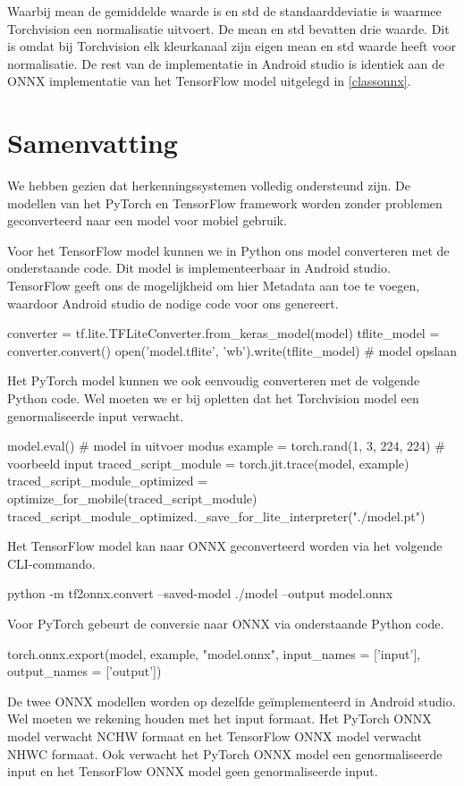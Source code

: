 Waarbij mean de gemiddelde waarde is en std de standaarddeviatie is waarmee Torchvision een normalisatie uitvoert.
De mean en std bevatten drie waarde.
Dit is omdat bij Torchvision elk kleurkanaal zijn eigen mean en std waarde heeft voor normalisatie.
De rest van de implementatie in Android studio is identiek aan de ONNX implementatie van het TensorFlow model uitgelegd in \ref{classonnx}. 

\section{Samenvatting}
We hebben gezien dat herkenningssystemen volledig ondersteund zijn.
De modellen van het PyTorch en TensorFlow framework worden zonder problemen geconverteerd naar een model voor mobiel gebruik.

Voor het TensorFlow model kunnen we in Python ons model converteren met de onderstaande code.
Dit model is implementeerbaar in Android studio.
TensorFlow geeft ons de mogelijkheid om hier Metadata aan toe te voegen, waardoor Android studio de nodige code voor ons genereert.

\begin{python}
    converter = tf.lite.TFLiteConverter.from_keras_model(model)
    tflite_model = converter.convert()
    open('model.tflite', 'wb').write(tflite_model) # model opslaan
\end{python}

Het PyTorch model kunnen we ook eenvoudig converteren met de volgende Python code.
Wel moeten we er bij opletten dat het Torchvision model een genormaliseerde input verwacht.

\begin{python}
model.eval() # model in uitvoer modus
example = torch.rand(1, 3, 224, 224) # voorbeeld input
traced_script_module = torch.jit.trace(model, example) 
traced_script_module_optimized = optimize_for_mobile(traced_script_module)
traced_script_module_optimized._save_for_lite_interpreter("./model.pt") 
\end{python}

Het TensorFlow model kan naar ONNX geconverteerd worden via het volgende CLI-commando.

\begin{python}
python -m tf2onnx.convert --saved-model ./model --output model.onnx
\end{python}

Voor PyTorch gebeurt de conversie naar ONNX via onderstaande Python code.

\begin{python}
torch.onnx.export(model, example, "model.onnx",
        input_names = ['input'], output_names = ['output'])    
\end{python}

De twee ONNX modellen worden op dezelfde ge\"implementeerd in Android studio.
Wel moeten we rekening houden met het input formaat.
Het PyTorch ONNX model verwacht NCHW formaat en het TensorFlow ONNX model verwacht NHWC formaat.
Ook verwacht het PyTorch ONNX model een genormaliseerde input en het TensorFlow ONNX model geen genormaliseerde input.